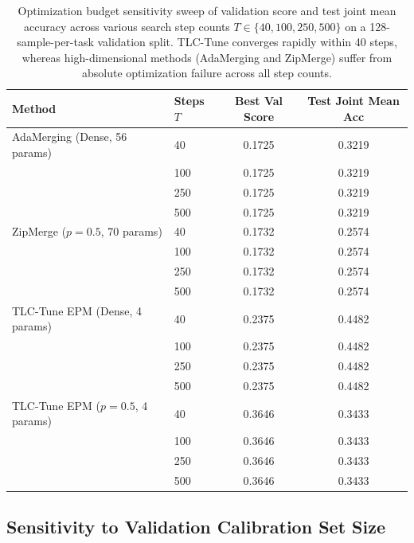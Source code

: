 \begin{table}[htbp]
\caption{Optimization budget sensitivity sweep of validation score and test joint mean accuracy across various search step counts $T \in \{40, 100, 250, 500\}$ on a 128-sample-per-task validation split. TLC-Tune converges rapidly within 40 steps, whereas high-dimensional methods (AdaMerging and ZipMerge) suffer from absolute optimization failure across all step counts.}
\label{tab:opt_study}
\vskip 0.15in
\begin{center}
\begin{small}
\begin{sc}
\begin{tabular}{llcc}
\toprule
Method & Steps $T$ & Best Val Score & Test Joint Mean Acc \\
\midrule
AdaMerging (Dense, 56 params) & 40 & 0.1725 & 0.3219 \\
 & 100 & 0.1725 & 0.3219 \\
 & 250 & 0.1725 & 0.3219 \\
 & 500 & 0.1725 & 0.3219 \\
\midrule
ZipMerge ($p=0.5$, 70 params) & 40 & 0.1732 & 0.2574 \\
 & 100 & 0.1732 & 0.2574 \\
 & 250 & 0.1732 & 0.2574 \\
 & 500 & 0.1732 & 0.2574 \\
\midrule
TLC-Tune EPM (Dense, 4 params) & 40 & 0.2375 & 0.4482 \\
 & 100 & 0.2375 & 0.4482 \\
 & 250 & 0.2375 & 0.4482 \\
 & 500 & 0.2375 & 0.4482 \\
\midrule
TLC-Tune EPM ($p=0.5$, 4 params) & 40 & 0.3646 & 0.3433 \\
 & 100 & 0.3646 & 0.3433 \\
 & 250 & 0.3646 & 0.3433 \\
 & 500 & 0.3646 & 0.3433 \\
\bottomrule
\end{tabular}
\end{sc}
\end{small}
\end{center}
\vskip -0.1in
\end{table}

\subsection{Sensitivity to Validation Calibration Set Size}
\label{submission:val_size_sensitivity}

